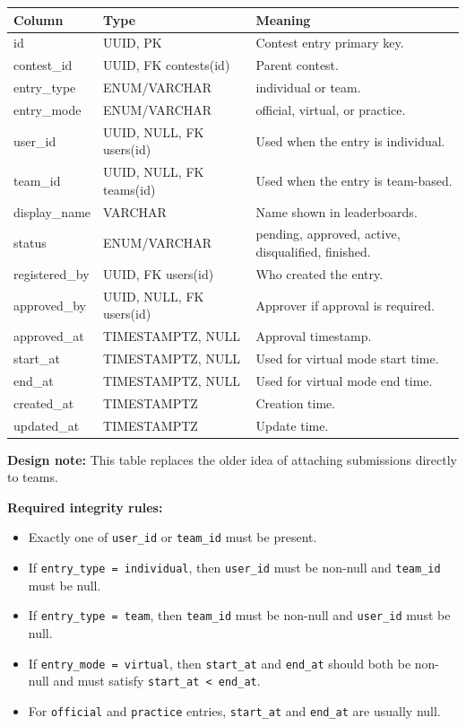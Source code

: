 \documentclass[11pt,a4paper]{article}
\begin{document}
\begin{longtable}{>{\raggedright\arraybackslash}p{} >{\raggedright\arraybackslash}p{} >{\raggedright\arraybackslash}p{}}
\toprule
\textbf{Column} & \textbf{Type} & \textbf{Meaning} \\
\midrule
id & UUID, PK & Contest entry primary key. \\
contest\_id & UUID, FK contests(id) & Parent contest. \\
entry\_type & ENUM/VARCHAR & individual or team. \\
entry\_mode & ENUM/VARCHAR & official, virtual, or practice. \\
user\_id & UUID, NULL, FK users(id) & Used when the entry is individual. \\
team\_id & UUID, NULL, FK teams(id) & Used when the entry is team-based. \\
display\_name & VARCHAR & Name shown in leaderboards. \\
status & ENUM/VARCHAR & pending, approved, active, disqualified, finished. \\
registered\_by & UUID, FK users(id) & Who created the entry. \\
approved\_by & UUID, NULL, FK users(id) & Approver if approval is required. \\
approved\_at & TIMESTAMPTZ, NULL & Approval timestamp. \\
start\_at & TIMESTAMPTZ, NULL & Used for virtual mode start time. \\
end\_at & TIMESTAMPTZ, NULL & Used for virtual mode end time. \\
created\_at & TIMESTAMPTZ & Creation time. \\
updated\_at & TIMESTAMPTZ & Update time. \\
\bottomrule
\end{longtable}

\textbf{Design note:}
This table replaces the older idea of attaching submissions directly to teams.

\textbf{Required integrity rules:}
\begin{itemize}
    \item Exactly one of \texttt{user\_id} or \texttt{team\_id} must be present.
    \item If \texttt{entry\_type = individual}, then \texttt{user\_id} must be non-null and \texttt{team\_id} must be null.
    \item If \texttt{entry\_type = team}, then \texttt{team\_id} must be non-null and \texttt{user\_id} must be null.
    \item If \texttt{entry\_mode = virtual}, then \texttt{start\_at} and \texttt{end\_at} should both be non-null and must satisfy \texttt{start\_at < end\_at}.
    \item For \texttt{official} and \texttt{practice} entries, \texttt{start\_at} and \texttt{end\_at} are usually null.
\end{itemize}
\end{document}
